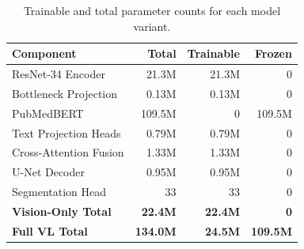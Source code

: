 \begin{table}[htbp]
	\caption{Trainable and total parameter counts for each model variant.}
	\label{tab:params}
	\centering
	\begin{tabular}{lrrr}
		\toprule
		\textbf{Component} & \textbf{Total} & \textbf{Trainable} & \textbf{Frozen} \\
		\midrule
		ResNet-34 Encoder        & 21.3M & 21.3M & 0     \\
		Bottleneck Projection    & 0.13M & 0.13M & 0     \\
		PubMedBERT               & 109.5M & 0    & 109.5M \\
		Text Projection Heads    & 0.79M & 0.79M & 0     \\
		Cross-Attention Fusion   & 1.33M & 1.33M & 0     \\
		U-Net Decoder            & 0.95M & 0.95M & 0     \\
		Segmentation Head        & 33    & 33    & 0     \\
		\midrule
		\textbf{Vision-Only Total}    & \textbf{22.4M} & \textbf{22.4M} & \textbf{0} \\
		\textbf{Full VL Total}        & \textbf{134.0M} & \textbf{24.5M} & \textbf{109.5M} \\
		\bottomrule
	\end{tabular}
\end{table}
